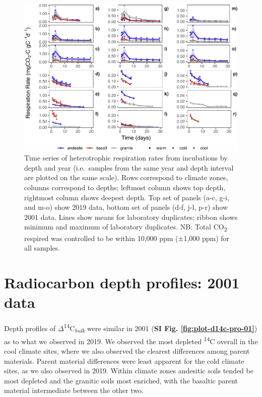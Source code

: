 \documentclass[english,man,floatsintext]{apa6}
\begin{document}
\begin{figure}

{\centering \includegraphics{sra-blk-inc-SI_files/figure-latex/plot-C-resp-rates-ts-1} 

}

\caption{Time series of heterotrophic respiration rates from incubations by depth and year (i.e.~samples from the same year and depth interval are plotted on the same scale). Rows correspond to climate zones, columns correspond to depths; leftmost column shows top depth, rightmost column shows deepest depth. Top set of panels (a-c, g-i, and m-o) show 2019 data, bottom set of panels (d-f, j-l, p-r) show 2001 data. Lines show means for laboratory duplicates; ribbon shows minimum and maximum of laboratory duplicates. NB: Total CO\textsubscript{2} respired was controlled to be within 10,000 ppm (±1,000 ppm) for all samples.}\label{fig:plot-C-resp-rates-ts}
\end{figure}



\hypertarget{radiocarbon-depth-profiles-2001-data}{%
\section{Radiocarbon depth profiles: 2001 data}\label{radiocarbon-depth-profiles-2001-data}}

Depth profiles of \(\Delta\)\textsuperscript{14}C\textsubscript{\emph{bulk}} were similar in 2001 (\textbf{SI Fig. \ref{fig:plot-d14c-pro-01}}) as to what we observed in 2019. We observed the most depleted \textsuperscript{14}C overall in the cool climate sites, where we also observed the clearest differences among parent materials. Parent material differences were least apparent for the cold climate sites, as we also observed in 2019. Within climate zones andesitic soils tended be most depleted and the granitic soils most enriched, with the basaltic parent material intermediate between the other two.
\end{document}
